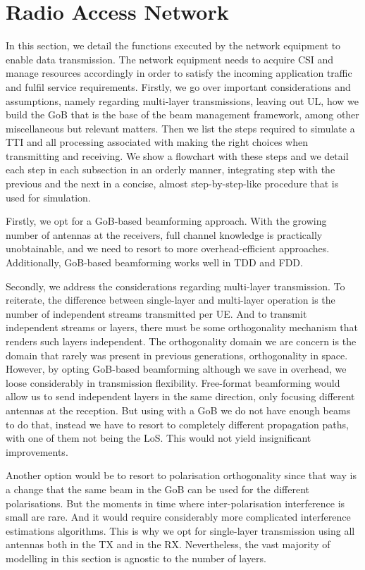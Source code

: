 \section{Radio Access Network}
\label{sec:access}

In this section, we detail the functions executed by the network equipment to enable data transmission. The network equipment needs to acquire \acs{CSI} and manage resources accordingly in order to satisfy the incoming application traffic and fulfil service requirements. Firstly, we go over important considerations and assumptions, namely regarding multi-layer transmissions, leaving out \ac{UL}, how we build the \ac{GoB} that is the base of the beam management framework, among other miscellaneous but relevant matters. Then we list the steps required to simulate a \ac{TTI} and all processing associated with making the right choices when transmitting and receiving. We show a flowchart with these steps and we detail each step in each subsection in an orderly manner, integrating step with the previous and the next in a concise, almost step-by-step-like procedure that is used for simulation.

Firstly, we opt for a \ac{GoB}-based beamforming approach. With the growing number of antennas at the receivers, full channel knowledge is practically unobtainable, and we need to resort to more overhead-efficient approaches. Additionally, \ac{GoB}-based beamforming works well in \acs{TDD} and \acs{FDD}.

Secondly, we address the considerations regarding multi-layer transmission. To reiterate, the difference between single-layer and multi-layer operation is the number of independent streams transmitted per \ac{UE}. And to transmit independent streams or layers, there must be some orthogonality mechanism that renders such layers independent. The orthogonality domain we are concern is the domain that rarely was present in previous generations, orthogonality in space. However, by opting \ac{GoB}-based beamforming although we save in overhead, we loose considerably in transmission flexibility. Free-format beamforming would allow us to send independent layers in the same direction, only focusing different antennas at the reception. But using with a \ac{GoB} we do not have enough beams to do that, instead we have to resort to completely different propagation paths, with one of them not being the \ac{LoS}. This would not yield insignificant improvements. 

Another option would be to resort to polarisation orthogonality since that way is a change that the same beam in the GoB can be used for the different polarisations. But the moments in time where inter-polarisation interference is small are rare. And it would require considerably more complicated interference estimations algorithms. This is why we opt for single-layer transmission using all antennas both in the \ac{TX} and in the \ac{RX}. Nevertheless, the vast majority of modelling in this section is agnostic to the number of layers.


